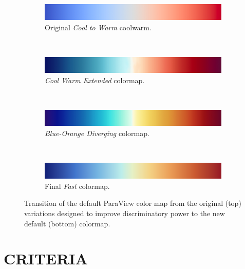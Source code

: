 \documentclass{IEEEcsmag}
\newcommand*{\colormap}[1]{\textsl{#1}\xspace}
\newcommand*{\coolwarm}{\colormap{Cool to Warm}}
\newcommand*{\blueorange}{\colormap{Blue-Orange Diverging}}
\newcommand*{\fast}{\colormap{Fast}}
\begin{document}
\begin{figure}[htb]
  \begin{subfigure}{\linewidth}
    \includegraphics[width=\linewidth]{map-cool-to-warm}
    \vspace{-1.4\baselineskip}
    \caption{Original \coolwarm coolwarm.}
    \label{fig:design:coolwarm}
  \end{subfigure}\\[4pt]
  \begin{subfigure}{\linewidth}
    \includegraphics[width=\linewidth]{Final_Pics/CW_extended.png}
    \vspace{-1.4\baselineskip}
    \caption{\textit{Cool Warm Extended} colormap.}
    \label{fig:design:cw est}
  \end{subfigure}\\[4pt]
  \begin{subfigure}{\linewidth}
    \includegraphics[width=\linewidth]{map-blue-orange-diverging}
    \vspace{-1.4\baselineskip}
    \caption{\blueorange colormap.}
    \label{fig:design:blueorange}
  \end{subfigure}\\[4pt]
  \begin{subfigure}{\linewidth}
    \includegraphics[width=\linewidth]{map-fast}
    \vspace{-1.4\baselineskip}
    \caption{Final \fast colormap.}
    \label{fig:design:fast}
  \end{subfigure}
  \caption{
    Transition of the default ParaView color map from the original (top) variations designed to improve discriminatory power to the new default (bottom) colormap.
  }
  \label{fig:designs}
\end{figure}


\section{CRITERIA}
\end{document}

